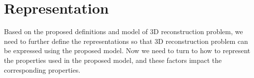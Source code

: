 \section{Representation}
\label{sec:3DRecon_Rep}
Based on the proposed definitions and model of 3D reconstruction problem, we need to further define the representations so that 3D reconstruction problem can be expressed using the proposed model. Now we need to turn to how to represent the properties used in the proposed model, and these factors impact the corresponding properties.







